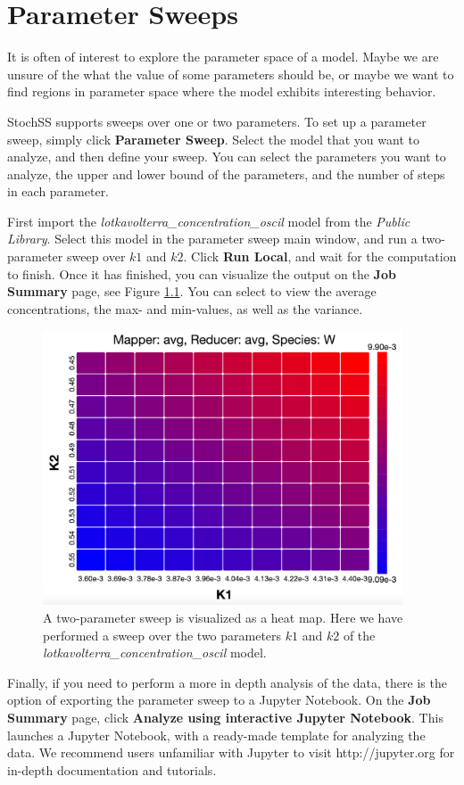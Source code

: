 
\chapter{Parameter Sweeps}

It is often of interest to explore the parameter space of a model. Maybe we are unsure of the what the value of some parameters should be, or maybe we want to find regions in parameter space where the model exhibits interesting behavior.

StochSS supports sweeps over one or two parameters. To set up a parameter sweep, simply click \textbf{Parameter Sweep}. Select the model that you want to analyze, and then define your sweep. You can select the parameters you want to analyze, the upper and lower bound of the parameters, and the number of steps in each parameter.

First import the \emph{lotkavolterra\_concentration\_oscil} model from the \emph{Public Library}. Select this model in the parameter sweep main window, and run a two-parameter sweep over $k1$ and $k2$. Click \textbf{Run Local}, and wait for the computation to finish. Once it has finished, you can visualize the output on the \textbf{Job Summary} page, see Figure \ref{psweep-fig1}. You can select to view the average concentrations, the max- and min-values, as well as the variance.
\begin{figure}[!ht]
\centering
\includegraphics[width=0.95\textwidth]{Psweep/heatmap.png}
\caption{\label{psweep-fig1}A two-parameter sweep is visualized as a heat map. Here we have performed a sweep over the two parameters $k1$ and $k2$ of the \emph{lotkavolterra\_concentration\_oscil} model. }
\end{figure}

Finally, if you need to perform a more in depth analysis of the data, there is the option of exporting the parameter sweep to a Jupyter Notebook. On the \textbf{Job Summary} page, click \textbf{Analyze using interactive Jupyter Notebook}. This launches a Jupyter Notebook, with a ready-made template for analyzing the data. We recommend users unfamiliar with Jupyter to visit http://jupyter.org for in-depth documentation and tutorials.

